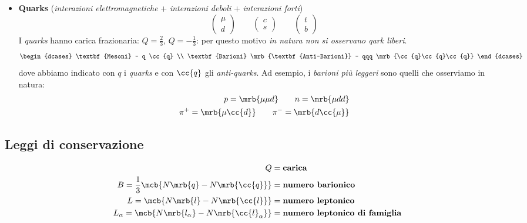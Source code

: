 \begin{itemize}
  \item \textbf{Quarks} (\textit{interazioni elettromagnetiche} +
    \textit{interazioni deboli} + \textit{interazioni forti})
    \[
      \begin{pmatrix}
        \mu \\ d
      \end{pmatrix}
      \qquad
      \begin{pmatrix}
        c \\ s
      \end{pmatrix}
      \qquad
      \begin{pmatrix}
        t \\ b
      \end{pmatrix}
    \]
    I \textit{quarks} hanno carica frazionaria: $Q = \frac{2}{3}$, $Q = -
    \frac{1}{3}$: per questo motivo \textit{in natura non si osservano qark
    liberi}.
    \[
      \begin{dcases}
        \textbf{Mesoni} - q \cc{q}
        \\
        \textbf{Barioni} \mrb{\textbf{Anti-Barioni}} - qqq
        \mrb{\cc{q}\cc{q}\cc{q}}
      \end{dcases}
    \]
    dove abbiamo indicato con $q$ i \textit{quarks} e con $\cc{q}$ gli
    \textit{anti-quarks}. Ad esempio, i \textit{barioni più leggeri} sono
    quelli che osserviamo in natura:
    \begin{align*}
      p = \mrb{\mu \mu d} \qquad n = \mrb{\mu dd}
      \\
      \pi^+ = \mrb{\mu \cc{d}} \qquad \pi^- = \mrb{d \cc{\mu}}
    \end{align*}
\end{itemize}

\subsection{Leggi di conservazione}
\begin{align*}
  Q &= \textbf{carica}
  \\
  B = \frac{1}{3} \mcb{N \mrb{q} - N \mrb{\cc{q}}} &= \textbf{numero barionico}
  \\
  L = \mcb{N \mrb{l} - N \mrb{\cc{l}}} &= \textbf{numero leptonico}
  \\
  L _{\alpha} = \mcb{N \mrb{l _{\alpha}} - N \mrb{\cc{l}_{\alpha}}} &=
  \textbf{numero leptonico di famiglia}
\end{align*}
